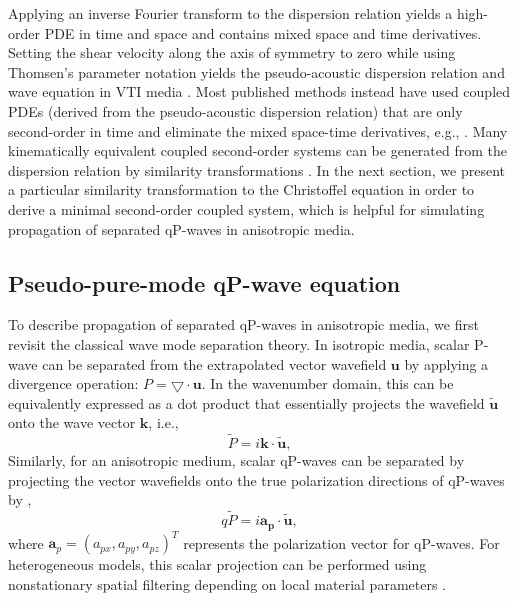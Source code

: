 Applying an inverse Fourier transform to the dispersion relation yields a high-order PDE in time and space
 and contains mixed space and time derivatives. Setting the shear velocity along the axis of symmetry to zero
while using Thomsen's parameter notation yields the pseudo-acoustic dispersion relation and wave equation
 in VTI media \cite[]{alkhalifah:2000}. Most published methods instead
 have used coupled PDEs (derived from the pseudo-acoustic dispersion relation) that are only second-order in time and
 eliminate the mixed space-time derivatives, e.g., \cite{zhou:2006eage}. Many kinematically equivalent
 coupled second-order systems can be generated from the dispersion relation
 by similarity transformations \cite[]{fowler:2010}. In the next section, we present a particular similarity
 transformation to the Christoffel equation in order to derive a minimal second-order coupled system,
 which is helpful for simulating propagation of separated qP-waves in anisotropic media.

\subsection{Pseudo-pure-mode qP-wave equation}
To describe propagation of separated qP-waves in anisotropic media, we first revisit the classical wave mode
 separation theory. In isotropic media, scalar P-wave can be separated from the extrapolated
 vector wavefield $\mathbf{u}$ by applying a divergence operation: $P = \bigtriangledown\cdot{\mathbf{u}}$.
 In the wavenumber domain,
this can be equivalently expressed as a dot product that essentially projects the wavefield
	$\widetilde{\mathbf{u}}$ onto the wave vector $\mathbf{k}$, i.e.,
\begin{equation}
\label{eq:PSep}
\widetilde{P} = i\mathbf{k}\cdot{\widetilde{\mathbf{u}}},
\end{equation}
Similarly, for an anisotropic medium, scalar qP-waves can be separated
by projecting the vector wavefields onto the true polarization
 directions of qP-waves by
\cite[]{dellinger.etgen:1990},
\begin{equation}
\label{eq:qPSep}
q\widetilde{P} = i\mathbf{a_{p}}\cdot{\widetilde{\mathbf{u}}},
\end{equation}
where $\mathbf{a}_{p}=(a_{px},a_{py},a_{pz})^{T}$ represents the polarization vector for qP-waves.
For heterogeneous models, this scalar projection can be performed using
nonstationary spatial filtering depending on local material parameters \cite[]{yan.sava:2009}.

